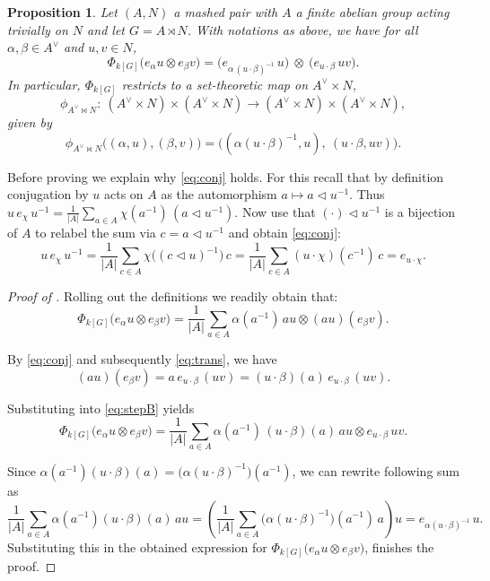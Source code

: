 \documentclass[a4paper,10pt]{amsart}
\newtheorem{proposition}[lemma]{Proposition}
\theoremstyle{definition}
\theoremstyle{remark}
\newcommand\trianglel{\triangleleft}
\newcommand\ot{\otimes}
\begin{document}
\begin{proposition}\label{thm:dual}
Let $(A,N)$ a mashed pair with $A$ a finite abelian group acting trivially on $N$ and let $G = A \rtimes N$. With notations as above, we have for all $\alpha,\beta\in A^\vee$ and $u,v\in N$,
\begin{equation}\label{eq:Phi-dual}
\Phi_{k[G]}\bigl(e_\alpha u\ot e_\beta v \bigr)
=
\bigl(e_{\alpha\,(u\cdot\beta)^{-1}}\,u\bigr)\ \ot\ \bigl(e_{u\cdot\beta}\,uv\bigr).
\end{equation}
In particular, $\Phi_{k[G]}$ restricts to a set-theoretic map on $A^\vee\times N$,
\[
\phi_{A^\vee\bowtie N}:\ (A^\vee\times N)\times(A^\vee\times N)\to (A^\vee\times N)\times(A^\vee\times N),
\]
given by
\begin{equation}\label{eq:setdual}
\phi_{A^\vee\bowtie N}\bigl((\alpha,u),(\beta,v)\bigr)
=
\bigl((\alpha(u\cdot\beta)^{-1},u),\ (u\cdot\beta,uv)\bigr).
\end{equation}
\end{proposition}

Before proving  we explain why \eqref{eq:conj} holds. For this  recall that by definition conjugation by $u$ acts on $A$ as the automorphism
$a\mapsto a\triangleleft u^{-1}$. Thus $u\,e_\chi\,u^{-1}
=\frac{1}{|A|}\sum_{a\in A}\chi(a^{-1})\,(a\triangleleft u^{-1}).$ Now use that $(\cdot )\trianglel u^{-1}$ is a bijection of $A$ to relabel the sum via $c=a\triangleleft u^{-1}$ and obtain \eqref{eq:conj}:
\[
u\,e_\chi\,u^{-1}
=\frac{1}{|A|}\sum_{c\in A}\chi\bigl((c\triangleleft u)^{-1}\bigr)\,c
=\frac{1}{|A|}\sum_{c\in A}(u\cdot\chi)(c^{-1})\,c
=e_{u\cdot\chi}.
\]


\begin{proof}[Proof of ]
Rolling out the definitions we readily obtain that:
\begin{equation}\label{eq:stepB}
\Phi_{k[G]}\bigl(e_\alpha u \ot e_\beta v \bigr)
=
\frac{1}{|A|}\sum_{a\in A}\alpha(a^{-1})\, au\ot (au)(e_\beta v).
\end{equation}

By \eqref{eq:conj} and subsequently \eqref{eq:trans}, we have 
$$(au)(e_\beta v)=a\,e_{u\cdot\beta}\,(uv) = (u\cdot\beta)(a)\,e_{u\cdot\beta}\,(uv).$$

Substituting into \eqref{eq:stepB} yields
\begin{equation*}
\Phi_{k[G]}\bigl(e_\alpha u \ot e_\beta v\bigr)
=
\frac{1}{|A|}\sum_{a\in A}\alpha(a^{-1})\,(u\cdot\beta)(a)\, au \ot  e_{u\cdot\beta}\,uv.
\end{equation*}

Since $\alpha(a^{-1})(u\cdot\beta)(a)=\bigl(\alpha (u\cdot\beta)^{-1}\bigr)(a^{-1})$, we can rewrite following sum as
\[
\frac{1}{|A|}\sum_{a\in A}\alpha(a^{-1})(u\cdot\beta)(a)\, au
=
\left(\frac{1}{|A|}\sum_{a\in A}\bigl(\alpha (u\cdot\beta)^{-1}\bigr)(a^{-1})\,a\right)u
=
e_{\alpha (u\cdot\beta)^{-1}}\,u.
\]
Substituting this in the obtained expression for $\Phi_{k[G]}\bigl(e_\alpha u \ot e_\beta v\bigr)$, finishes the proof.
\end{proof} 
\end{document}
